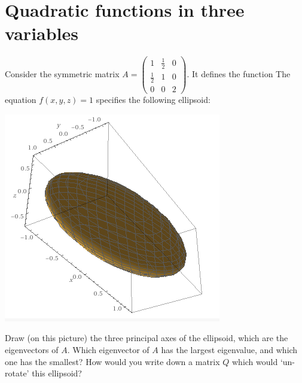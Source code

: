 \documentclass[10pt]{amsart}
\theoremstyle{mythm}
\theoremstyle{definition}
\theoremstyle{myrmk}
\begin{document}
	\section{Quadratic functions in three variables} 
	
	Consider the symmetric matrix $A = \begin{pmatrix}
	1 & \frac12 & 0 \\
	\frac12 & 1 & 0 \\
	0 & 0 & 2
	\end{pmatrix}$. It defines the function 
	The equation $f(x, y, z) = 1$ specifies the following ellipsoid: 
	\begin{center}
		\includegraphics{rec10-pic4}
	\end{center}
	Draw (on this picture) the three principal axes of the ellipsoid, which are the eigenvectors of $A$. Which eigenvector of $A$ has the largest eigenvalue, and which one has the smallest? How would you write down a matrix $Q$ which would `un-rotate' this ellipsoid? 
	
\end{document}
